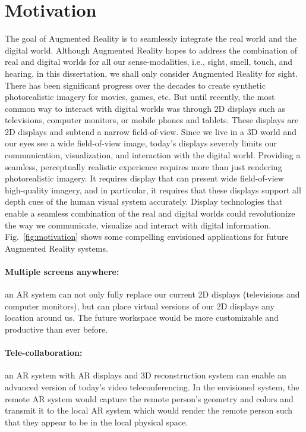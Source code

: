 \section{Motivation}



The goal of Augmented Reality is to seamlessly integrate the real world and the digital world.
Although Augmented Reality hopes to address the combination of real and digital worlds for all our sense-modalities, i.e., sight, smell, touch, and hearing, in this dissertation, we shall only consider Augmented Reality for sight. 
There has been significant progress over the decades to create synthetic photorealistic imagery for movies, games, etc. 
But until recently, the most common way to interact with digital worlds was through 2D displays such as televisions, computer monitors, or mobile phones and tablets. 
These displays are 2D displays and subtend a narrow field-of-view. 
Since we live in a 3D world and our eyes see a wide field-of-view image, today’s displays severely limits our communication, visualization, and interaction with the digital world. 
Providing a seamless, perceptually realistic experience requires more than just rendering photorealistic imagery. 
It requires display that can present wide field-of-view high-quality imagery, and in particular, it requires that these displays support all depth cues of the human visual system \cite{Palmer:1999, Howard:2002} accurately. 
Display technologies that enable a seamless combination of the real and digital worlds could revolutionize the way we communicate, visualize and interact with digital information.
Fig.~\ref{fig:motivation} shows some compelling envisioned applications for future Augmented Reality systems.

\paragraph{Multiple screens anywhere:} an AR system can not only fully replace our current 2D displays (televisions and computer monitors), but can place virtual versions of our 2D displays any location around us. 
The future workspace would be more customizable and productive than ever before.
\paragraph{Tele-collaboration:} an AR system with AR displays and 3D reconstruction system can enable an advanced version of today’s video teleconferencing. 
In the envisioned system, the remote AR system would capture the remote person’s geometry and colors and transmit it to the local AR system which would render the remote person such that they appear to be in the local physical space. 
